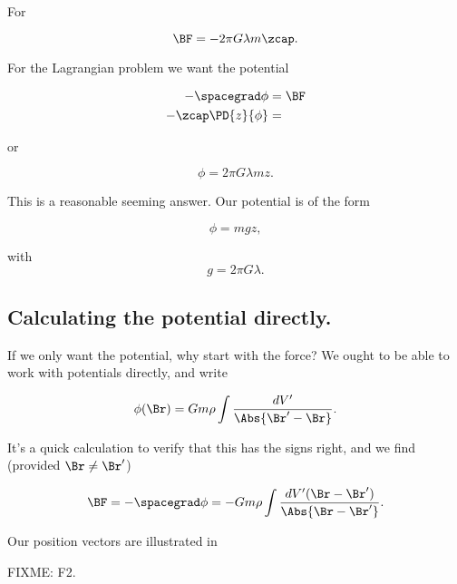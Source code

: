 For

\begin{equation}\label{eqn:classicalMechanicsPs2:n}
\BF = -2 \pi G \lambda m \zcap.
\end{equation}

For the Lagrangian problem we want the potential 

\begin{align*}
-\spacegrad \phi &= \BF \\
-\zcap \PD{z}{\phi} &= \\
\end{align*}

or

\begin{equation}\label{eqn:classicalMechanicsPs2:n}
\phi = 2 \pi G \lambda m z.
\end{equation}

This is a reasonable seeming answer.  Our potential is of the form

\begin{equation}\label{eqn:classicalMechanicsPs2:n}
\phi = m g z,
\end{equation}

with
\begin{equation}\label{eqn:classicalMechanicsPs2:n}
g = 2 \pi G \lambda.
\end{equation}

\subsection{Calculating the potential directly.}

If we only want the potential, why start with the force?  We ought to be able to work with potentials directly, and write

\begin{equation}\label{eqn:classicalMechanicsPs2:n}
\phi(\Br) = G m \rho \int \frac{dV'}{\Abs{\Br' - \Br}}.
\end{equation}

It's a quick calculation to verify that this has the signs right, and we find (provided $\Br \ne \Br'$)

\begin{equation}\label{eqn:classicalMechanicsPs2:n}
\BF = - \spacegrad \phi = - G m \rho \int \frac{dV' (\Br - \Br')}{\Abs{\Br - \Br'}}.
\end{equation}

Our position vectors are illustrated in 

FIXME: F2.


